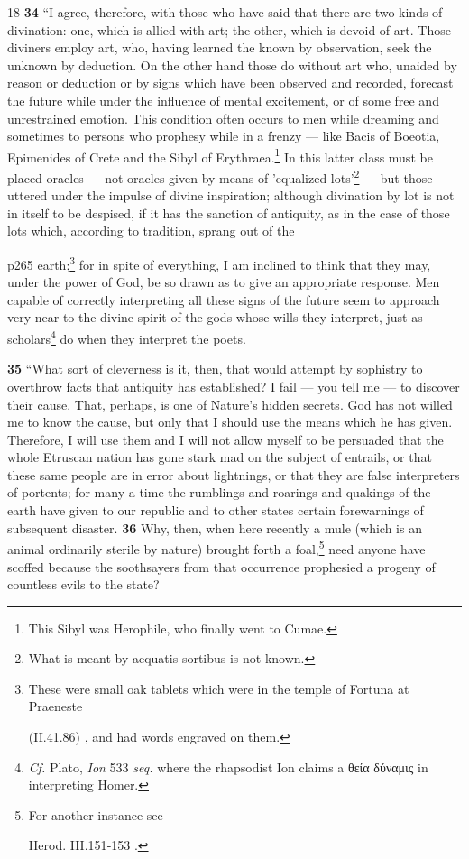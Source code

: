 18
\textbf{34} ``I agree, therefore, with those who have said that there are two kinds of divination: one, which is allied with art; the other, which is devoid of art. Those diviners employ art, who, having learned the known by observation, seek the unknown by deduction. On the other hand those do without art who, unaided by reason or deduction or by signs which have been observed and recorded, forecast the future while under the influence of mental excitement, or of some free and unrestrained emotion. This condition often occurs to men while dreaming and sometimes to persons who prophesy while in a frenzy \texthebrew{—} like Bacis of Boeotia, Epimenides of Crete and the Sibyl of Erythraea.\texthebrew{}\footnote{This Sibyl was Herophile, who finally went to Cumae.

} In this latter class must be placed oracles \texthebrew{—} not oracles given by means of 'equalized lots'\texthebrew{}\footnote{What is meant by aequatis sortibus is not known.

} \texthebrew{—} but those uttered under the impulse of divine inspiration; although divination by lot is not in itself to be despised, if it has the sanction of antiquity, as in the case of those lots which, according to tradition, sprang out of the

p265 earth;\texthebrew{}\footnote{These were small oak tablets which were in the temple of Fortuna at Praeneste

(II.41.86) , and had words engraved on them.

} for in spite of everything, I am inclined to think that they may, under the power of God, be so drawn as to give an appropriate response. Men capable of correctly interpreting all these signs of the future seem to approach very near to the divine spirit of the gods whose wills they interpret, just as scholars\texthebrew{}\footnote{\emph{Cf.} Plato, \emph{Ion} 533 \emph{seq.} where the rhapsodist Ion claims a \textgreek{θεία δύναμις} in interpreting Homer.

} do when they interpret the poets.

\textbf{35} ``What sort of cleverness is it, then, that would attempt by sophistry to overthrow facts that antiquity has established? I fail \texthebrew{—} you tell me \texthebrew{—} to discover their cause. That, perhaps, is one of Nature's hidden secrets. God has not willed me to know the cause, but only that I should use the means which he has given. Therefore, I will use them and I will not allow myself to be persuaded that the whole Etruscan nation has gone stark mad on the subject of entrails, or that these same people are in error about lightnings, or that they are false interpreters of portents; for many a time the rumblings and roarings and quakings of the earth have given to our republic and to other states certain forewarnings of subsequent disaster. \textbf{36} Why, then, when here recently a mule (which is an animal ordinarily sterile by nature) brought forth a foal,\texthebrew{}\footnote{For another instance see

Herod. III.151\texthebrew{‑}153 .

} need anyone have scoffed because the soothsayers from that occurrence prophesied a progeny of countless evils to the state?

